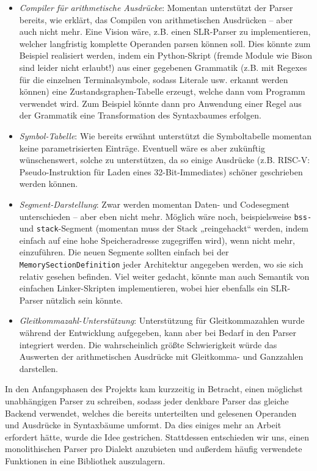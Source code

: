 \begin{itemize}

  \item \emph{Compiler für arithmetische Ausdrücke}: Momentan unterstützt der
  Parser bereits, wie erklärt, das Compilen von arithmetischen Ausdrücken – aber
  auch nicht mehr. Eine Vision wäre, z.B. einen SLR-Parser zu implementieren,
  welcher langfristig komplette Operanden parsen können soll. Dies könnte zum
  Beispiel realisiert werden, indem ein Python-Skript (fremde Module wie Bison
  sind leider nicht erlaubt!) aus einer gegebenen Grammatik (z.B. mit Regexes
  für die einzelnen Terminalsymbole, sodass Literale usw. erkannt werden können)
  eine Zustandsgraphen-Tabelle erzeugt, welche dann vom Programm verwendet wird.
  Zum Beispiel könnte dann pro Anwendung einer Regel aus der Grammatik eine
  Transformation des Syntaxbaumes erfolgen.

  \item \emph{Symbol-Tabelle}: Wie bereits erwähnt unterstützt die Symboltabelle
  momentan keine parametrisierten Einträge. Eventuell wäre es aber zukünftig
  wünschenswert, solche zu unterstützen, da so einige Ausdrücke (z.B. RISC-V:
  Pseudo-Instruktion für Laden eines 32-Bit-Immediates) schöner geschrieben
  werden können.

  \item \emph{Segment-Darstellung}: Zwar werden momentan Daten- und Codesegment
  unterschieden – aber eben nicht mehr. Möglich wäre noch, beispielsweise
  \texttt{bss-} und \texttt{stack}-Segment (momentan muss der Stack
  „reingehackt“ werden, indem einfach auf eine hohe Speicheradresse zugegriffen
  wird), wenn nicht mehr, einzuführen. Die neuen Segmente sollten einfach bei
  der \texttt{MemorySectionDefinition} jeder Architektur angegeben werden, wo
  sie sich relativ gesehen befinden. Viel weiter gedacht, könnte man auch
  Semantik von einfachen Linker-Skripten implementieren, wobei hier ebenfalls
  ein SLR-Parser nützlich sein könnte.

  \item \emph{Gleitkommazahl-Unterstützung}: Unterstützung für Gleitkommazahlen
  wurde während der Entwicklung aufgegeben, kann aber bei Bedarf in den Parser
  integriert werden. Die wahrscheinlich größte Schwierigkeit würde das Auswerten
  der arithmetischen Ausdrücke mit Gleitkomma- und Ganzzahlen darstellen.

\end{itemize}

In den Anfangsphasen des Projekts kam kurzzeitig in Betracht, einen möglichst
unabhängigen Parser zu schreiben, sodass jeder denkbare Parser das gleiche
Backend verwendet, welches die bereits unterteilten und gelesenen Operanden und
Ausdrücke in Syntaxbäume umformt. Da dies einiges mehr an Arbeit erfordert
hätte, wurde die Idee gestrichen. Stattdessen entschieden wir uns, einen
monolithischen Parser pro Dialekt anzubieten und außerdem häufig verwendete
Funktionen in eine Bibliothek auszulagern.
